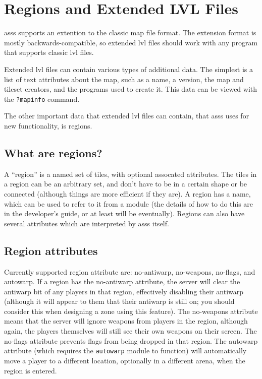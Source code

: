 \documentclass{article}
\newcommand{\asss}{asss}
\begin{document}
\section{Regions and Extended LVL Files}

\asss{} supports an extention to the classic map file format. The
extension format is mostly backwards-compatible, so extended lvl files
should work with any program that supports classic lvl files.

Extended lvl files can contain various types of additional data. The
simplest is a list of text attributes about the map, such as a name, a
version, the map and tileset creators, and the programs used to create
it. This data can be viewed with the \verb/?mapinfo/ command.

The other important data that extended lvl files can contain, that
\asss{} uses for new functionality, is regions.

\subsection{What are regions?}

A ``region'' is a named set of tiles, with optional assocated
attributes. The tiles in a region can be an arbitrary set, and don't
have to be in a certain shape or be connected (although things are more
efficient if they are). A region has a name, which can be used to refer
to it from a module (the details of how to do this are in the
developer's guide, or at least will be eventually). Regions can also
have several attributes which are interpreted by \asss{} itself.

\subsection{Region attributes}

Currently supported region attribute are: no-antiwarp, no-weapons,
no-flags, and autowarp. If a region has the no-antiwarp attribute, the
server will clear the antiwarp bit of any players in that region,
effectively disabling their antiwarp (although it will appear to them
that their antiwarp is still on; you should consider this when designing
a zone using this feature). The no-weapons attribute means that the
server will ignore weapons from players in the region, although again,
the players themselves will still see their own weapons on their screen.
The no-flags attribute prevents flags from being dropped in that region.
The autowarp attribute (which requires the \verb/autowarp/ module to
function) will automatically move a player to a different location,
optionally in a different arena, when the region is entered.
\end{document}
